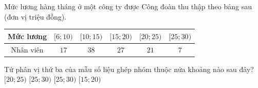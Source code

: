 \begin{ex}%
	Mức lương hàng tháng  ở một công ty được Công đoàn thu thập theo bảng sau (đơn vị triệu đồng).
	\begin{center}
		\begin{tabular}{|c|c|c|c|c|c|}
			\hline Mức lương & {$[6; 10)$}  & {$[10; 15)$} & {$[15; 20)$} & {$[20; 25)$} & {$[25; 30)$} \\
			\hline Nhân viên  & $17$ & $38$ & $27$ & $21$ & $7$ \\
			\hline 
		\end{tabular}
	\end{center}
	Tứ phân vị thứ ba  của mẫu số liệu ghép nhóm thuộc nửa khoảng nào sau đây?
	 \choice
		{\True $[20; 25)$} 
		{$[25;  30)$}
		 {$[25; 30)$}
		{$[15; 20)$} 
	 \loigiai{
		Tứ phân vị thứ ba thuộc $[20; 25)$. 
	 }
\end{ex}

